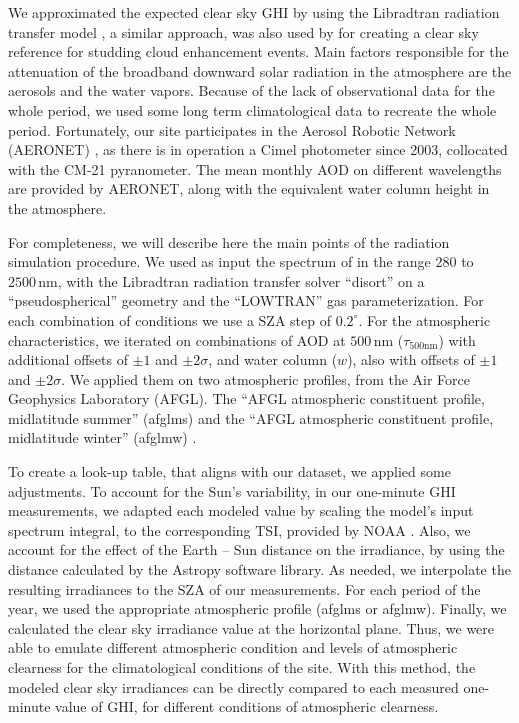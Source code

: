 \documentclass[preprint, 5p,
authoryear]{elsarticle} %
\begin{document}
We approximated the expected clear sky GHI by using the Libradtran
radiation transfer model \citep{Emde2016}, a similar approach, was also
used by \citet{Vamvakas2020} for creating a clear sky reference for
studding cloud enhancement events. Main factors responsible for the
attenuation of the broadband downward solar radiation in the atmosphere
are the aerosols and the water vapors. Because of the lack of
observational data for the whole period, we used some long term
climatological data to recreate the whole period. Fortunately, our site
participates in the Aerosol Robotic Network (AERONET)
\citep{Giles2019, Buis1998}, as there is in operation a Cimel photometer
since 2003, collocated with the CM-21 pyranometer. The mean monthly AOD
on different wavelengths are provided by AERONET, along with the
equivalent water column height in the atmosphere.

For completeness, we will describe here the main points of the radiation
simulation procedure. We used as input the spectrum of
\citet{Kurucz1994} in the range \(280\) to \(2500\,\text{nm}\), with the
Libradtran radiation transfer solver ``disort'' on a ``pseudospherical''
geometry and the ``LOWTRAN'' gas parameterization. For each combination
of conditions we use a SZA step of \(0.2^\circ\). For the atmospheric
characteristics, we iterated on combinations of AOD at
\(500\,\text{nm}\) (\(\tau_{500\text{nm}}\)) with additional offsets of
\(\pm1\) and \(\pm2\sigma\), and water column (\(w\)), also with offsets
of \(\pm1\) and \(\pm2\sigma\). We applied them on two atmospheric
profiles, from the Air Force Geophysics Laboratory (AFGL). The ``AFGL
atmospheric constituent profile, midlatitude summer'' (afglms) and the
``AFGL atmospheric constituent profile, midlatitude winter'' (afglmw)
\citep{Anderson1986}.

To create a look-up table, that aligns with our dataset, we applied some
adjustments. To account for the Sun's variability, in our one-minute GHI
measurements, we adapted each modeled value by scaling the model's input
spectrum integral, to the corresponding TSI, provided by NOAA
\citep{Coddington2005}. Also, we account for the effect of the Earth --
Sun distance on the irradiance, by using the distance calculated by the
Astropy \citep{AstropyCollaboration2022} software library. As needed, we
interpolate the resulting irradiances to the SZA of our measurements.
For each period of the year, we used the appropriate atmospheric profile
(afglms or afglmw). Finally, we calculated the clear sky irradiance
value at the horizontal plane. Thus, we were able to emulate different
atmospheric condition and levels of atmospheric clearness for the
climatological conditions of the site. With this method, the modeled
clear sky irradiances can be directly compared to each measured
one-minute value of GHI, for different conditions of atmospheric
clearness.
\end{document}
